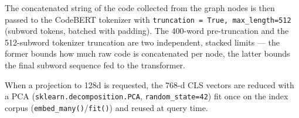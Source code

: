 The concatenated string of the code collected from the graph nodes is then passed to the CodeBERT tokenizer with \texttt{truncation = True, max\_length=512} (subword tokens, batched with padding). The 400-word pre-truncation and the 512-subword tokenizer truncation are two independent, stacked limits — the former bounds how much raw code is concatenated per node, the latter bounds the final subword sequence fed to the transformer.


When a projection to 128d is requested, the 768-d CLS vectors are reduced with a PCA (\texttt{sklearn.decomposition.PCA}, \texttt{random\_state=42}) fit once on the index corpus (\texttt{embed\_many()}/\texttt{fit()}) and reused at query time.

